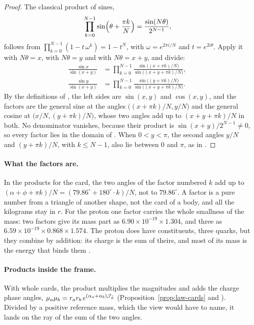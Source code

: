 \begin{proof}
The classical product of sines,
\[
\prod_{k=0}^{N-1} \sin\Bigl(\theta + \frac{\pi k}{N}\Bigr) = \frac{\sin(N\theta)}{2^{N-1}} ,
\]
follows from $\prod_{k=0}^{N-1}(1 - t\,\omega^k) = 1 - t^N$, with $\omega = e^{2\pi i/N}$ and $t = e^{2i\theta}$. Apply it with $N\theta = x$, with $N\theta = y$ and with $N\theta = x + y$, and divide:
\begin{align*}
\frac{\sin x}{\sin(x + y)} &= \prod_{k=0}^{N-1} \frac{\sin\bigl((x + \pi k)/N\bigr)}{\sin\bigl((x + y + \pi k)/N\bigr)} , \\
\frac{\sin y}{\sin(x + y)} &= \prod_{k=0}^{N-1} \frac{\sin\bigl((y + \pi k)/N\bigr)}{\sin\bigl((x + y + \pi k)/N\bigr)} .
\end{align*}
By the definitions of , the left sides are $\sin(x, y)$ and $\cos(x, y)$, and the factors are the general sine at the angles $\bigl((x + \pi k)/N, y/N\bigr)$ and the general cosine at $\bigl(x/N, (y + \pi k)/N\bigr)$, whose two angles add up to $(x + y + \pi k)/N$ in both. No denominator vanishes, because their product is $\sin(x + y)/2^{N-1} \neq 0$, so every factor lies in the domain of . When $0 < y < \pi$, the second angles $y/N$ and $(y + \pi k)/N$, with $k \leq N - 1$, also lie between $0$ and $\pi$, as in .
\end{proof}

\paragraph{What the factors are.}
In the products for the card, the two angles of the factor numbered $k$ add up to $(\alpha + \phi + \pi k)/N = (79.86^\circ + 180^\circ \cdot k)/N$, not to $79.86^\circ$. A factor is a pure number from a triangle of another shape, not the card of a body, and all the kilograms stay in $r$. For the proton one factor carries the whole smallness of the mass: two factors give its mass part as $6.90 \times 10^{-19} \times 1.304$, and three as $6.59 \times 10^{-19} \times 0.868 \times 1.574$. The proton does have constituents, three quarks, but they combine by addition: its charge is the sum of theirs, and most of its mass is the energy that binds them \citep{PDG2024}.

\paragraph{Products inside the frame.}
With whole cards, the product multiplies the magnitudes and adds the charge phase angles, $\mu_a\mu_b = r_a r_b\,e^{(\alpha_a + \alpha_b)\mathcal{J}_{\bar{\phi}}}$ (Proposition~\ref{prop:law-cards} and ). Divided by a positive reference mass, which the view would have to name, it lands on the ray of the sum of the two angles.

